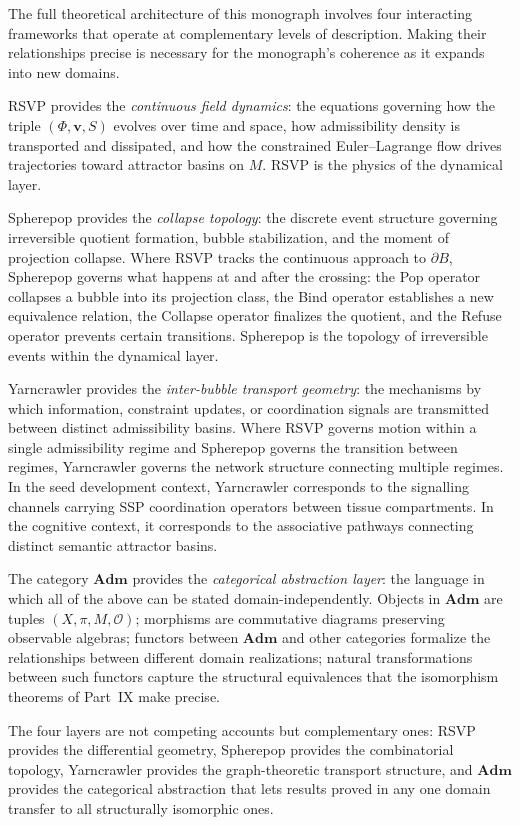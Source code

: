 \documentclass[12pt, a4paper]{article}
\theoremstyle{essaystyle}
\begin{document}
The full theoretical architecture of this monograph involves four interacting frameworks
that operate at complementary levels of description. Making their relationships precise
is necessary for the monograph's coherence as it expands into new domains.

RSVP provides the \emph{continuous field dynamics}: the equations governing how the
triple $(\Phi, \mathbf{v}, S)$ evolves over time and space, how admissibility density
is transported and dissipated, and how the constrained Euler--Lagrange flow drives
trajectories toward attractor basins on $M$. RSVP is the physics of the dynamical layer.

Spherepop provides the \emph{collapse topology}: the discrete event structure governing
irreversible quotient formation, bubble stabilization, and the moment of projection
collapse. Where RSVP tracks the continuous approach to $\partial B$, Spherepop governs
what happens at and after the crossing: the Pop operator collapses a bubble into its
projection class, the Bind operator establishes a new equivalence relation, the Collapse
operator finalizes the quotient, and the Refuse operator prevents certain transitions.
Spherepop is the topology of irreversible events within the dynamical layer.

Yarncrawler provides the \emph{inter-bubble transport geometry}: the mechanisms by
which information, constraint updates, or coordination signals are transmitted between
distinct admissibility basins. Where RSVP governs motion within a single admissibility
regime and Spherepop governs the transition between regimes, Yarncrawler governs
the network structure connecting multiple regimes. In the seed development context,
Yarncrawler corresponds to the signalling channels carrying SSP coordination operators
between tissue compartments. In the cognitive context, it corresponds to the
associative pathways connecting distinct semantic attractor basins.

The category $\mathbf{Adm}$ provides the \emph{categorical abstraction layer}: the
language in which all of the above can be stated domain-independently. Objects in
$\mathbf{Adm}$ are tuples $(X, \pi, M, \mathcal{O})$; morphisms are commutative
diagrams preserving observable algebras; functors between $\mathbf{Adm}$ and other
categories formalize the relationships between different domain realizations; natural
transformations between such functors capture the structural equivalences that the
isomorphism theorems of Part~IX make precise.

The four layers are not competing accounts but complementary ones: RSVP provides the
differential geometry, Spherepop provides the combinatorial topology, Yarncrawler
provides the graph-theoretic transport structure, and $\mathbf{Adm}$ provides the
categorical abstraction that lets results proved in any one domain transfer to all
structurally isomorphic ones.
\end{document}
